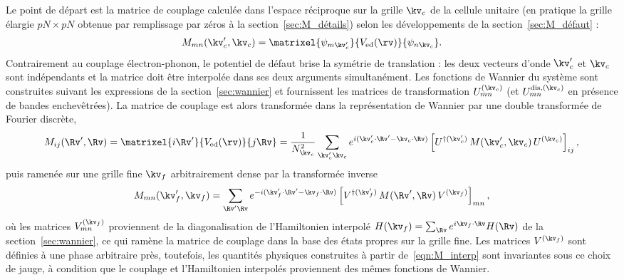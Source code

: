 Le point de départ est la matrice de couplage calculée dans l'espace
réciproque sur la grille $\kv_c$ de la cellule unitaire (en pratique la grille
élargie $pN\times pN$ obtenue par remplissage par zéros à la
section~\ref{sec:M_détails}) selon
les développements de la section~\ref{sec:M_défaut} :
\begin{equation}
    M_{mn}(\kv_c',\kv_c) = \matrixel{\psi_{m\kv_c'}}{V_\text{ed}(\rv)}{\psi_{n\kv_c}}.
\end{equation}
Contrairement au couplage électron-phonon, le potentiel de défaut brise la symétrie de translation : les deux vecteurs d'onde $\kv_c'$ et
$\kv_c$ sont indépendants et la matrice doit être interpolée dans ses
deux arguments simultanément. Les fonctions de Wannier du système sont construites suivant les expressions de la section~\ref{sec:wannier} et fournissent les matrices de transformation $U^{(\kv_c)}_{mn}$ (et $U^{\text{dis},(\kv_c)}_{mn}$ en présence de
bandes enchevêtrées). La matrice de couplage est alors transformée dans
la représentation de Wannier par une double transformée de Fourier
discrète,
\begin{equation}
    M_{ij}(\Rv',\Rv) = \matrixel{i\Rv'}{V_\text{ed}(\rv)}{j\Rv}
    = \frac{1}{N_{\kv_c}^2}\sum_{\kv_c'\kv_c}
    e^{i(\kv_c'\cdot\Rv'-\kv_c\cdot\Rv)}
    \left[U^{\dag(\kv_c')}\,M(\kv_c',\kv_c)\,U^{(\kv_c)}\right]_{ij},
    \label{eqn:M_wannier}
\end{equation}
puis ramenée sur une grille fine $\kv_f$ arbitrairement dense par la transformée inverse
\begin{equation}
    M_{mn}(\kv_f',\kv_f) = \sum_{\Rv'\Rv}
    e^{-i(\kv_f'\cdot\Rv'-\kv_f\cdot\Rv)}
    \left[V^{\dag(\kv_f')}\,M(\Rv',\Rv)\,V^{(\kv_f)}\right]_{mn},
    \label{eqn:M_interp}
\end{equation}
où les matrices $V^{(\kv_f)}_{mn}$ proviennent de la diagonalisation de l'Hamiltonien interpolé $H(\kv_f) = \sum_{\Rv} e^{i\kv_f\cdot\Rv} H(\Rv)$ de la section~\ref{sec:wannier}, ce qui ramène la matrice de couplage dans la base des états propres sur la grille fine. Les matrices $V^{(\kv_f)}$ sont définies à une phase arbitraire près, toutefois, les quantités physiques construites à partir de~\eqref{eqn:M_interp} sont invariantes sous ce
choix de jauge, à condition que le couplage et l'Hamiltonien interpolés
proviennent des mêmes fonctions de Wannier.

